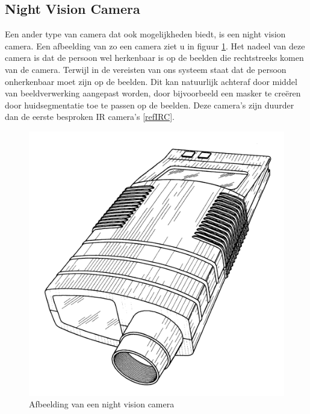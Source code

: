 \subsection{Night Vision Camera}
\label{refNVC}
Een ander type van camera dat ook mogelijkheden biedt, is een night vision camera. Een afbeelding van zo een camera ziet u in figuur \ref{imgNVC}\cite{bibNVC}. Het nadeel van deze camera is dat de persoon wel herkenbaar is op de beelden die rechtstreeks komen van de camera. Terwijl in de vereisten van ons systeem staat dat de persoon onherkenbaar moet zijn op de beelden. Dit kan natuurlijk achteraf door middel van beeldverwerking aangepast worden, door bijvoorbeeld een masker te cre\"eren door huidsegmentatie toe te passen op de beelden. Deze camera's zijn duurder dan de eerste besproken IR camera's \ref{refIRC}.

\begin{figure}[hbp]
	\includegraphics[scale=0.075]{NightVisionCamera}
	\caption{Afbeelding van een night vision camera}
	\label{imgNVC}
\end{figure}

